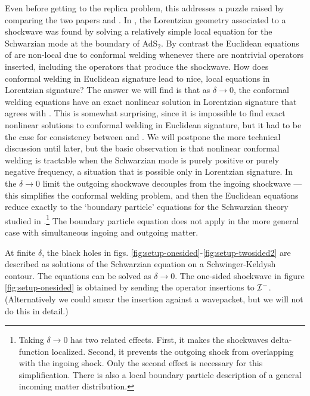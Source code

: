 \documentclass[12pt]{article}
\numberwithin{equation}{section}
\begin{document}
\begin{spacing}{1.1}
Even before getting to the replica problem, this addresses a puzzle raised by comparing the two papers \cite{Almheiri:2019psf} and \cite{Almheiri:2019qdq}. In \cite{Almheiri:2019psf}, the Lorentzian geometry associated to a shockwave was found by solving a relatively simple local equation for the Schwarzian mode \cite{Engelsoy:2016xyb} at the boundary of AdS$_2$. By contrast the Euclidean equations of \cite{Almheiri:2019qdq} are non-local due to conformal welding whenever there are nontrivial operators inserted, including the operators that produce the shockwave. How does conformal welding in Euclidean signature lead to nice, local equations in Lorentzian signature? The answer we will find is that as $\delta \to 0$, the conformal welding equations have an exact nonlinear solution in Lorentzian signature that agrees with \cite{Almheiri:2019psf}. This is somewhat surprising, since it is impossible to find exact nonlinear solutions to conformal welding in Euclidean signature, but it had to be the case for consistency between \cite{Almheiri:2019psf} and \cite{Almheiri:2019qdq}. We will postpone the more technical discussion until later, but the basic observation is that nonlinear conformal welding is tractable when the Schwarzian mode is purely positive or purely negative frequency, a situation that is possible only in Lorentzian signature. In the $\delta \to 0$ limit the outgoing shockwave decouples from the ingoing shockwave --- this simplifies the conformal welding problem, and then the Euclidean equations reduce exactly to the `boundary particle' equations for the Schwarzian theory studied in \cite{Maldacena:2016upp,Engelsoy:2016xyb,Almheiri:2019psf}.\footnote{Taking $\delta \to 0$ has two related effects. First, it makes the shockwaves delta-function localized. Second, it prevents the outgoing shock from overlapping with the ingoing shock. Only the second effect is necessary for this simplification. There is also a local boundary particle description of a general incoming matter distribution.} The boundary particle equation does not apply in the more general case with simultaneous ingoing and outgoing matter.

At finite $\delta$, the black holes in figs. \ref{fig:setup-onesided}-\ref{fig:setup-twosided2} are described as solutions of the Schwarzian equation on a Schwinger-Keldysh contour. The equations can be solved as $\delta \to 0$. The one-sided shockwave in figure \ref{fig:setup-onesided} is obtained by sending the operator insertions to ${\cal I}^-$. (Alternatively we could smear the insertion against a wavepacket, but we will not do this in detail.)




\end{spacing}
\end{document}
